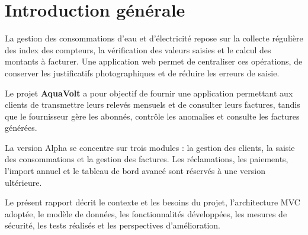 \section*{Introduction générale}

La gestion des consommations d'eau et d'électricité repose sur la collecte régulière des index des compteurs, la vérification des valeurs saisies et le calcul des montants à facturer. Une application web permet de centraliser ces opérations, de conserver les justificatifs photographiques et de réduire les erreurs de saisie.

Le projet \textbf{AquaVolt} a pour objectif de fournir une application permettant aux clients de transmettre leurs relevés mensuels et de consulter leurs factures, tandis que le fournisseur gère les abonnés, contrôle les anomalies et consulte les factures générées.

La version Alpha se concentre sur trois modules : la gestion des clients, la saisie des consommations et la gestion des factures. Les réclamations, les paiements, l'import annuel et le tableau de bord avancé sont réservés à une version ultérieure.

Le présent rapport décrit le contexte et les besoins du projet, l'architecture MVC adoptée, le modèle de données, les fonctionnalités développées, les mesures de sécurité, les tests réalisés et les perspectives d'amélioration.
